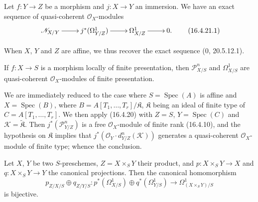 \begin{corollary}[16.4.21]
\label{IV.16.4.21}
Let $f:Y\to Z$ be a morphism and $j:X\to Y$ an immersion. We have an exact
sequence of quasi-coherent $\mathcal{O}_X$-modules
\[
  \xymatrix{
    \mathscr{N}_{X/Y}\ar[r]&j^*(\Omega_{Y/Z}^1)\ar[r]&
    \Omega_{X/Z}^1\ar[r]&0.
  }
  \tag{16.4.21.1}
  \label{IV.16.4.21.1}
\]
\end{corollary}

When $X$, $Y$ and $Z$ are affine, we thus recover the exact sequence
(0, 20.5.12.1).

\begin{corollary}[16.4.22]
\label{IV.16.4.22}
If $f:X\to S$ is a morphism locally of finite presentation, then
$\mathscr{P}_{X/S}^n$ and $\Omega_{X/S}^1$ are quasi-coherent
$\mathcal{O}_X$-modules of finite presentation.
\end{corollary}

We are immediately reduced to the case where $S=\operatorname{Spec}(A)$ is affine
and $X=\operatorname{Spec}(B)$, where
$B=A[T_1,\ldots,T_r]/\mathfrak{K}$, $\mathfrak{K}$ being an ideal of finite
type of $C=A[T_1,\ldots,T_r]$. We then apply (16.4.20) with $Z=S$,
$Y=\operatorname{Spec}(C)$ and $\mathscr{K}=\widetilde{\mathfrak{K}}$. Then
$j^*(\mathscr{P}_{Y/Z}^n)$ is a free $\mathcal{O}_X$-module of finite rank
(16.4.10), and the hypothesis on $\mathfrak{K}$ implies that
$j^*(\mathcal{O}_Y\cdot d_{Y/Z}^n(\mathscr{K}))$ generates a quasi-coherent
$\mathcal{O}_X$-module of finite type; whence the conclusion.

\begin{proposition}[16.4.23]
\label{IV.16.4.23}
Let $X$, $Y$ be two $S$-preschemes, $Z=X\times_S Y$ their product, and
$p:X\times_S Y\to X$ and $q:X\times_S Y\to Y$ the canonical projections.
Then the canonical homomorphism
\[
  p_{Z/X/S}\oplus q_{Z/Y/S}:
  p^*(\Omega_{X/S}^1)\oplus q^*(\Omega_{Y/S}^1)
  \longrightarrow\Omega_{(X\times_S Y)/S}^1
  \tag{16.4.23.1}
  \label{IV.16.4.23.1}
\]
is bijective.
\end{proposition}

